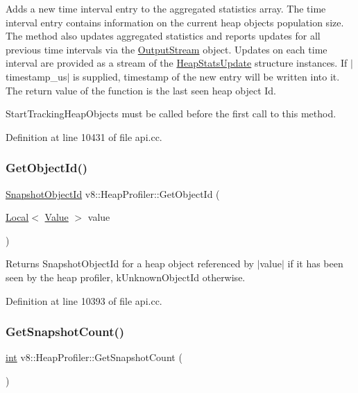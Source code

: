 Adds a new time interval entry to the aggregated statistics array. The time interval entry contains information on the current heap objects population size. The method also updates aggregated statistics and reports updates for all previous time intervals via the \mbox{\hyperlink{classv8_1_1OutputStream}{Output\+Stream}} object. Updates on each time interval are provided as a stream of the \mbox{\hyperlink{structv8_1_1HeapStatsUpdate}{Heap\+Stats\+Update}} structure instances. If $\vert$timestamp\+\_\+us$\vert$ is supplied, timestamp of the new entry will be written into it. The return value of the function is the last seen heap object Id.

Start\+Tracking\+Heap\+Objects must be called before the first call to this method. 

Definition at line 10431 of file api.\+cc.

\mbox{\label{classv8_1_1HeapProfiler_ab926a1f1ed95b731d4ef3133e67eef19}} 
\subsubsection{\texorpdfstring{Get\+Object\+Id()}{GetObjectId()}}
{\footnotesize\ttfamily \mbox{\hyperlink{classuint32__t}{Snapshot\+Object\+Id}} v8\+::\+Heap\+Profiler\+::\+Get\+Object\+Id (\begin{DoxyParamCaption}\item[{\mbox{\hyperlink{classv8_1_1Local}{Local}}$<$ \mbox{\hyperlink{classv8_1_1Value}{Value}} $>$}]{value }\end{DoxyParamCaption})}

Returns Snapshot\+Object\+Id for a heap object referenced by $\vert$value$\vert$ if it has been seen by the heap profiler, k\+Unknown\+Object\+Id otherwise. 

Definition at line 10393 of file api.\+cc.

\mbox{\label{classv8_1_1HeapProfiler_a24830775a0ab938eb0a29ed8f3dfd265}} 
\subsubsection{\texorpdfstring{Get\+Snapshot\+Count()}{GetSnapshotCount()}}
{\footnotesize\ttfamily \mbox{\hyperlink{classint}{int}} v8\+::\+Heap\+Profiler\+::\+Get\+Snapshot\+Count (\begin{DoxyParamCaption}{ }\end{DoxyParamCaption})}

